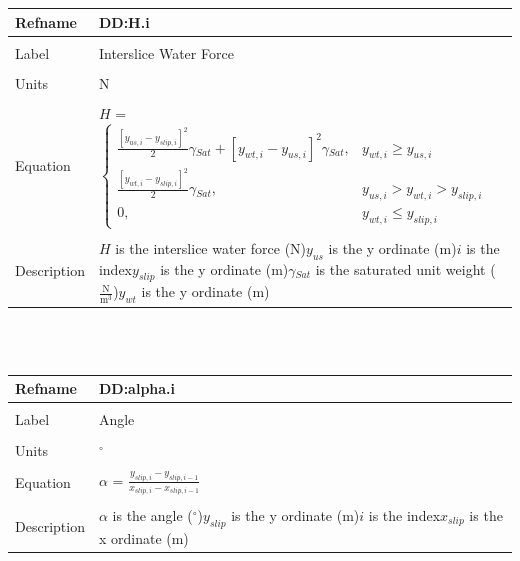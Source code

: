 \documentclass[12pt]{article}
\begin{document}
\noindent \begin{minipage}{\textwidth}
\begin{tabular}{p{} p{}}
\toprule \textbf{Refname} & \textbf{DD:H.i}
\label{DD:H.i}
\\ \midrule \\
Label & Interslice Water Force
\\ \midrule \\
Units & N
\\ \midrule \\
Equation & $H$ = $\begin{cases}
\frac{\left[{y_{us,i}}-{y_{slip,i}}\right]^{2}}{2} {\gamma{}_{Sat}}+\left[{y_{wt,i}}-{y_{us,i}}\right]^{2} {\gamma{}_{Sat}}, & {y_{wt,i}}\geq{}{y_{us,i}}\\
\frac{\left[{y_{wt,i}}-{y_{slip,i}}\right]^{2}}{2} {\gamma{}_{Sat}}, & {y_{us,i}}>{y_{wt,i}}>{y_{slip,i}}\\
0, & {y_{wt,i}}\leq{}{y_{slip,i}}
\end{cases}$
\\ \midrule \\
Description & $H$ is the interslice water force (N)\newline${y_{us}}$ is the y ordinate (m)\newline$i$ is the index\newline${y_{slip}}$ is the y ordinate (m)\newline${\gamma{}_{Sat}}$ is the saturated unit weight ($\frac{\text{N}}{\text{m}^{3}}$)\newline${y_{wt}}$ is the y ordinate (m)
\\ \bottomrule \end{tabular}
\end{minipage}\\
~\newline
\noindent \begin{minipage}{\textwidth}
\begin{tabular}{p{} p{}}
\toprule \textbf{Refname} & \textbf{DD:alpha.i}
\label{DD:alpha.i}
\\ \midrule \\
Label & Angle
\\ \midrule \\
Units & ${}^{\circ}$
\\ \midrule \\
Equation & $\alpha{}$ = $\frac{{y_{slip,i}}-{y_{slip,i-1}}}{{x_{slip,i}}-{x_{slip,i-1}}}$
\\ \midrule \\
Description & $\alpha{}$ is the angle (${}^{\circ}$)\newline${y_{slip}}$ is the y ordinate (m)\newline$i$ is the index\newline${x_{slip}}$ is the x ordinate (m)
\\ \bottomrule \end{tabular}
\end{minipage}\\
\end{document}
